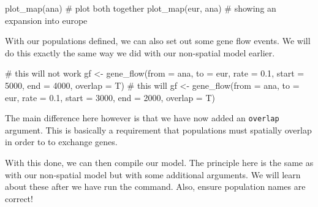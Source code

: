 \documentclass[
  letterpaper,
  DIV=11,
  numbers=noendperiod]{scrartcl}
\newenvironment{Shaded}{\begin{snugshade}}{\end{snugshade}}
\newcommand{\AttributeTok}[1]{\textcolor[rgb]{0.40,0.45,0.13}{#1}}
\newcommand{\CommentTok}[1]{\textcolor[rgb]{0.37,0.37,0.37}{#1}}
\newcommand{\DecValTok}[1]{\textcolor[rgb]{0.68,0.00,0.00}{#1}}
\newcommand{\FloatTok}[1]{\textcolor[rgb]{0.68,0.00,0.00}{#1}}
\newcommand{\FunctionTok}[1]{\textcolor[rgb]{0.28,0.35,0.67}{#1}}
\newcommand{\NormalTok}[1]{\textcolor[rgb]{0.00,0.23,0.31}{#1}}
\newcommand{\OtherTok}[1]{\textcolor[rgb]{0.00,0.23,0.31}{#1}}
\begin{document}
\begin{Shaded}
\begin{Highlighting}[]
\FunctionTok{plot\_map}\NormalTok{(ana)}
\CommentTok{\# plot both together}
\FunctionTok{plot\_map}\NormalTok{(eur, ana) }\CommentTok{\# showing an expansion into europe}
\end{Highlighting}
\end{Shaded}

With our populations defined, we can also set out some gene flow events.
We will do this exactly the same way we did with our non-spatial model
earlier.

\begin{Shaded}
\begin{Highlighting}[]
\CommentTok{\# this will not work}
\NormalTok{gf }\OtherTok{\textless{}{-}} \FunctionTok{gene\_flow}\NormalTok{(}\AttributeTok{from =}\NormalTok{ ana, }\AttributeTok{to =}\NormalTok{ eur, }\AttributeTok{rate =} \FloatTok{0.1}\NormalTok{, }\AttributeTok{start =} \DecValTok{5000}\NormalTok{, }\AttributeTok{end =} \DecValTok{4000}\NormalTok{, }\AttributeTok{overlap =}\NormalTok{ T)}
\CommentTok{\# this will }
\NormalTok{gf }\OtherTok{\textless{}{-}} \FunctionTok{gene\_flow}\NormalTok{(}\AttributeTok{from =}\NormalTok{ ana, }\AttributeTok{to =}\NormalTok{ eur, }\AttributeTok{rate =} \FloatTok{0.1}\NormalTok{, }\AttributeTok{start =} \DecValTok{3000}\NormalTok{, }\AttributeTok{end =} \DecValTok{2000}\NormalTok{, }\AttributeTok{overlap =}\NormalTok{ T)}
\end{Highlighting}
\end{Shaded}

The main difference here however is that we have now added an
\texttt{overlap} argument. This is basically a requirement that
populations must spatially overlap in order to to exchange genes.

With this done, we can then compile our model. The principle here is the
same as with our non-spatial model but with some additional arguments.
We will learn about these after we have run the command. Also, ensure
population names are correct!
\end{document}

